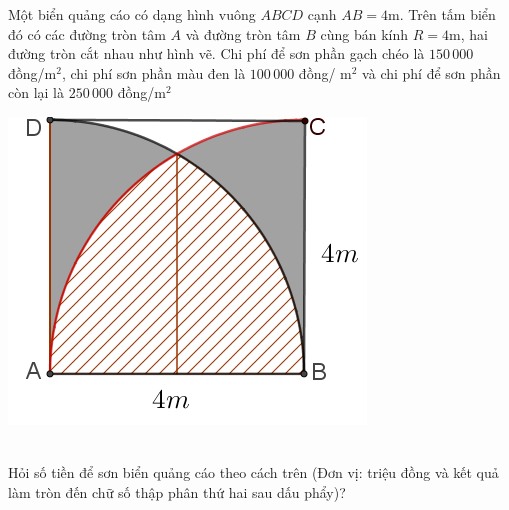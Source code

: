 \begin{ex}%
Một biển quảng cáo có dạng hình vuông $ ABCD$ cạnh $ AB=4\text{m}$. Trên tấm biển đó có các đường tròn tâm $ A$ và đường tròn tâm $ B$ cùng bán kính $ R=4\text{m}$, hai đường tròn cắt nhau như hình vẽ. Chi phí để sơn phần gạch chéo là $ 150\, 000$ đồng/$\text{m}^2$, chi phí sơn phần màu đen là $ 100\,000$ đồng/ $\text{m}^2$ và chi phí để sơn phần còn lại là $ 250\,000$ đồng/$\text{m}^2$\\
\centerline{\includegraphics[width=.25\textwidth]{images/5.20}}\\
Hỏi số tiền để sơn biển quảng cáo theo cách trên (Đơn vị: triệu đồng và kết quả làm tròn đến chữ số thập phân thứ hai sau dấu phẩy)?
\end{ex}

